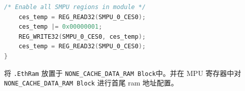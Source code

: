 \begin{lstlisting}[language=C,style=C]
    /* Enable all SMPU regions in module */
    ces_temp = REG_READ32(SMPU_0_CES0);
    ces_temp |= 0x00000001;
    REG_WRITE32(SMPU_0_CES0, ces_temp);
    ces_temp = REG_READ32(SMPU_0_CES0);
}
\end{lstlisting}

\begin{definition}[解决方案]
    将 \lstinline{.EthRam} 放置于 \lstinline{NONE_CACHE_DATA_RAM Block}中。并在 MPU 寄存器中对 \lstinline{NONE_CACHE_DATA_RAM Block} 进行首尾 ram 地址配置。
\end{definition}